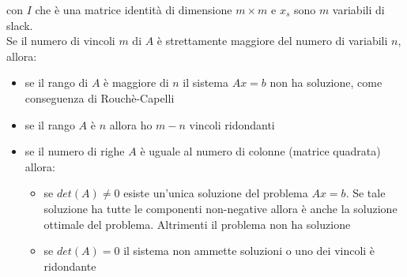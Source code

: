 \message{ !name(ro.tex)}\documentclass[a4paper,12pt, oneside]{book}
\begin{document}
con $I$ che è una matrice identità di dimensione $m\times m$ e $x_s$
sono $m$ variabili di slack.\\
Se il numero di vincoli $m$ di $A$ è strettamente maggiore del
numero di variabili $n$, allora:
\begin{itemize}
  \item se il rango di $A$ è maggiore di $n$ il sistema $Ax=b$ non
  ha soluzione, come conseguenza di Rouchè-Capelli
  \item se il rango $A$ è $n$ allora ho $m-n$ vincoli ridondanti
  \item se il numero di righe $A$ è uguale al numero di colonne
  (matrice quadrata) allora:
  \begin{itemize}
    \item se $det(A) \neq 0$ esiste un’unica soluzione del problema
    $Ax = b$. Se tale soluzione ha tutte le componenti non-negative
    allora è anche la soluzione ottimale del problema. Altrimenti
    il problema non ha soluzione
    \item se $det(A)=0$ il sistema non ammette soluzioni o uno dei
    vincoli è ridondante
  \end{itemize}
\end{itemize}
\end{document}
